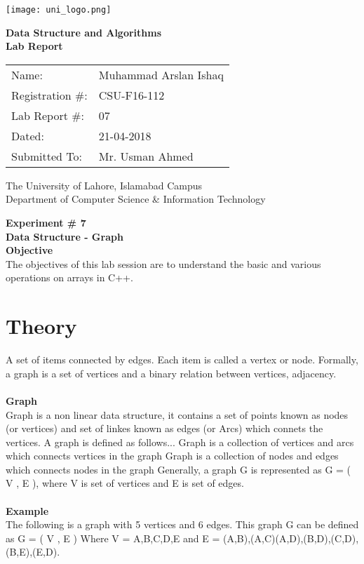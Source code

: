 \documentclass[11pt]{article}            %
\begin{document}
\begin{titlepage}
    \centering
  \vfill
    \texttt{[image: uni\_logo.png]} \\ 
	\vskip2cm
    {\bfseries\Large
	Data Structure and Algorithms \\ 
	
	\vskip2cm
	Lab Report 
	 
	\vskip2cm
	}    

\begin{center}
\begin{tabular}{ l l  } 

Name: & Muhammad Arslan Ishaq \\ 
Registration \#: & CSU-F16-112 \\ 
Lab Report \#: & 07 \\ 
 Dated:& 21-04-2018\\ 
Submitted To:& Mr. Usman Ahmed\\ 

\end{tabular}
\end{center}
    \vfill
    The University of Lahore, Islamabad Campus\\
Department of Computer Science \& Information Technology
\end{titlepage}


    
    {\bfseries\Large
\centering
	Experiment \# 7 \\

Data Structure - Graph \\
		}    
 \vskip1cm
 \textbf {Objective}\\  The objectives of this lab session are to understand the basic and various operations on arrays in C++. 



\section{Theory }              
 A set of items connected by edges. Each item is called a vertex or node. Formally, a graph is a set of vertices and a binary relation between vertices, adjacency. \\  \\
\textbf{Graph}\\ 
Graph is a non linear data structure, it contains a set of points known as nodes (or vertices) and set of linkes known as edges (or Arcs) which connets the vertices. A graph is defined as follows...
Graph is a collection of vertices and arcs which connects vertices in the graph
Graph is a collection of nodes and edges which connects nodes in the graph
Generally, a graph G is represented as G = ( V , E ), where V is set of vertices and E is set of edges.
  \\ \\
\textbf{Example }\\
The following is a graph with 5 vertices and 6 edges.
This graph G can be defined as G = ( V , E )
Where V = {A,B,C,D,E} and E = {(A,B),(A,C)(A,D),(B,D),(C,D),(B,E),(E,D)}.
\end{document}
